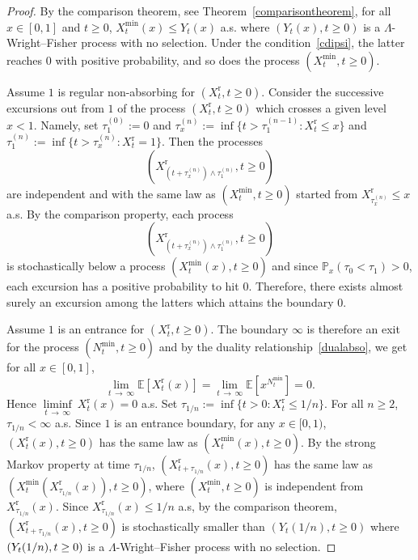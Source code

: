 \documentclass[AHL,Unicode,longabstracts,published]{cedram}
\newcommand{\rmr}{\mathrm{r}}
\newcommand{\bbE}{\mathbb{E}}
\newcommand{\bbP}{\mathbb{P}}
\begin{document}
\begin{proof}
By the comparison theorem, see Theorem~\ref{comparisontheorem}, for all $x\in [0,1]$ and $t\geq 0$, $X_t^{\min}(x)\leq Y_t(x)$ a.s. where $(Y_t(x),t\geq 0)$ is a $\Lambda$-Wright--Fisher process with no selection. Under the condition~\eqref{cdipsi}, the latter reaches $0$ with positive probability, and so does the process $(X_t^{\min},t\geq 0)$.

Assume $1$ is regular non-absorbing for $(X_t^{\rmr},t\geq 0)$. Consider the successive excursions out from $1$ of the process $(X_t^{\rmr},t\geq 0)$ which crosses a given level~$x<1$. Namely, set $\tau^{(0)}_1:=0$ and $ \tau^{(n)}_x:=\inf\{t>\tau^{(n-1)}_1: X_t^{\rmr}\leq x\}$ and $\tau^{(n)}_1:=\inf\{t>\tau^{(n)}_x: X_t^{\rmr}=1\}$. Then the processes
\[
\left(X^{\rmr}_{\left(t+\tau_x^{(n)}\right)\wedge \tau_1^{(n)}},t\geq 0\right)
\]
are independent and with the same law as $(X_t^{\min},t\geq 0)$ started from $X^{\rmr}_{\tau_x^{(n)}}\leq x$ a.s. By the comparison property, each process
\[
\left(X^{\rmr}_{\left(t+\tau_x^{(n)}\right)\wedge \tau_1^{(n)}},t\geq 0\right)
\]
is stochastically below a process $(X_t^{\min}(x),t\geq 0)$ and since $\bbP_x(\tau_0<\tau_1)>0$, each excursion has a positive probability to hit $0$. Therefore, there exists almost surely an excursion among the latters which attains the boundary $0$.

Assume $1$ is an entrance for $(X_t^{\rmr},t\geq 0)$. The boundary $\infty$ is therefore an exit for the process $(N^{\min}_t,t\geq 0)$ and by the duality relationship~\eqref{dualabso}, we get for all $x\in [0,1]$,
\[
\underset{t\,\rightarrow\,\infty}{\lim}\bbE\left[X_t^{\rmr}(x)\right]=\underset{t\,\rightarrow\,\infty}{\lim} \bbE\left[x^{N_t^{\min}}\right]=0.
\]
Hence $\underset{t\,\rightarrow\,\infty}{\liminf}\ X_t^{\rmr}(x)=0$ a.s. Set $\tau_{1/n}:=\inf\{t>0: X_t^{\rmr}\leq 1/n\}$. For all $n\geq 2$, $\tau_{1/n}<\infty$ a.s. Since $1$ is an entrance boundary, for any $x\in [0,1)$, $(X_t^{\rmr}(x),t\geq 0)$ has the same law as $(X_t^{\min}(x),t\geq 0)$. By the strong Markov property at time $\tau_{1/n}$, $(X_{t+\tau_{1/n}}^{\rmr}(x),t\geq 0)$ has the same law as $(X_t^{\min}(X^{\rmr}_{\tau_{1/n}}(x)),t\geq 0)$, where $(X_t^{\min},t\geq 0)$ is independent from $X^{\rmr}_{\tau_{1/n}}(x)$. Since $X^{\rmr}_{\tau_{1/n}}(x)\leq 1/n$ a.s, by the comparison theorem, $(X_{t+\tau_{1/n}}^{\rmr}(x),t\geq 0)$ is stochastically smaller than $(Y_t(1/n),t\geq 0)$ where $(Y_t(1/n),\linebreak t\geq 0)$ is a $\Lambda$-Wright--Fisher process with no selection.



\end{proof}
\end{document}
